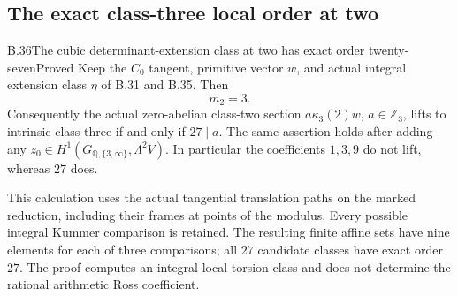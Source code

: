 \subsection{The exact class-three local order at two}

\begin{statement}{B.36}{The cubic determinant-extension class at two has exact order twenty-seven}{Proved}
Keep the $C_0$ tangent, primitive vector $w$, and actual
integral extension class $\eta$ of B.31 and B.35.
Then
\[
                              m_2=3.                         \tag{B.36.1}
\]
Consequently the actual zero-abelian class-two section
$a\kappa_3(2)w$, $a\in\mathbb Z_3$, lifts to intrinsic
class three if and only if $27\mid a$.
The same assertion holds after adding any
$z_0\in H^1(G_{\mathbb Q,\{3,\infty\}},\Lambda^2V)$.
In particular the coefficients $1,3,9$ do not lift,
whereas $27$ does.

This calculation uses the actual tangential translation
paths on the marked reduction, including their frames at
points of the modulus. Every possible integral Kummer
comparison is retained. The resulting finite affine sets
have nine elements for each of three comparisons; all
$27$ candidate classes have exact order $27$.
The proof computes an integral local torsion class and
does not determine the rational arithmetic Ross coefficient.
\end{statement}
